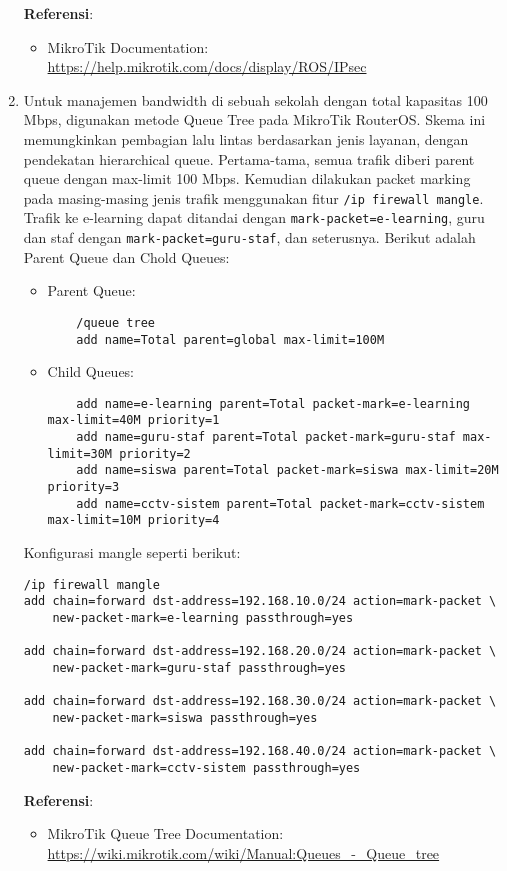 \begin{enumerate}
	\textbf{Referensi}:
	\begin{itemize}
		\item MikroTik Documentation: \url{https://help.mikrotik.com/docs/display/ROS/IPsec}
\end{itemize}
	\item Untuk manajemen bandwidth di sebuah sekolah dengan total kapasitas 100 Mbps, digunakan 
	metode Queue Tree pada MikroTik RouterOS. Skema ini memungkinkan pembagian lalu lintas 
	berdasarkan jenis layanan, dengan pendekatan hierarchical queue. Pertama-tama, semua trafik 
	diberi parent queue dengan max-limit 100 Mbps. Kemudian dilakukan packet marking 
	pada masing-masing jenis trafik menggunakan fitur \texttt{/ip firewall mangle}. Trafik 
	ke e-learning dapat ditandai dengan \texttt{mark-packet=e-learning}, guru dan staf dengan 
	\texttt{mark-packet=guru-staf}, dan seterusnya. Berikut adalah Parent Queue dan Chold Queues:

\begin{itemize}
    \item Parent Queue:
    \begin{verbatim}
    /queue tree
    add name=Total parent=global max-limit=100M
    \end{verbatim}

    \item Child Queues:
    \begin{verbatim}
    add name=e-learning parent=Total packet-mark=e-learning max-limit=40M priority=1
    add name=guru-staf parent=Total packet-mark=guru-staf max-limit=30M priority=2
    add name=siswa parent=Total packet-mark=siswa max-limit=20M priority=3
    add name=cctv-sistem parent=Total packet-mark=cctv-sistem max-limit=10M priority=4
    \end{verbatim}
\end{itemize}

Konfigurasi mangle seperti berikut:
\begin{verbatim}
/ip firewall mangle
add chain=forward dst-address=192.168.10.0/24 action=mark-packet \
    new-packet-mark=e-learning passthrough=yes

add chain=forward dst-address=192.168.20.0/24 action=mark-packet \
    new-packet-mark=guru-staf passthrough=yes

add chain=forward dst-address=192.168.30.0/24 action=mark-packet \
    new-packet-mark=siswa passthrough=yes

add chain=forward dst-address=192.168.40.0/24 action=mark-packet \
    new-packet-mark=cctv-sistem passthrough=yes
\end{verbatim}


\textbf{Referensi}:
\begin{itemize}
    \item MikroTik Queue Tree Documentation: \url{https://wiki.mikrotik.com/wiki/Manual:Queues_-_Queue_tree}
\end{itemize}

\end{enumerate}

